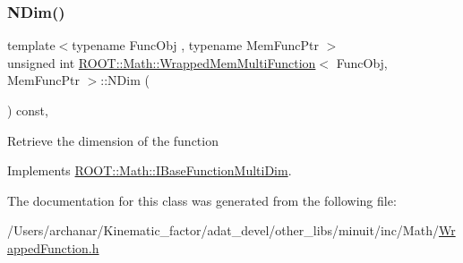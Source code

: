 \subsubsection{\texorpdfstring{NDim()}{NDim()}\hspace{0.1cm}{\footnotesize\ttfamily [2/2]}}
{\footnotesize\ttfamily template$<$typename Func\+Obj , typename Mem\+Func\+Ptr $>$ \\
unsigned int \mbox{\hyperlink{classROOT_1_1Math_1_1WrappedMemMultiFunction}{R\+O\+O\+T\+::\+Math\+::\+Wrapped\+Mem\+Multi\+Function}}$<$ Func\+Obj, Mem\+Func\+Ptr $>$\+::N\+Dim (\begin{DoxyParamCaption}{ }\end{DoxyParamCaption}) const\hspace{0.3cm}{\ttfamily [inline]}, {\ttfamily [virtual]}}

Retrieve the dimension of the function 

Implements \mbox{\hyperlink{classROOT_1_1Math_1_1IBaseFunctionMultiDim_a16f37dc7a6d00c75ddeda0697741315d}{R\+O\+O\+T\+::\+Math\+::\+I\+Base\+Function\+Multi\+Dim}}.



The documentation for this class was generated from the following file\+:\begin{DoxyCompactItemize}
\item 
/\+Users/archanar/\+Kinematic\+\_\+factor/adat\+\_\+devel/other\+\_\+libs/minuit/inc/\+Math/\mbox{\hyperlink{other__libs_2minuit_2inc_2Math_2WrappedFunction_8h}{Wrapped\+Function.\+h}}\end{DoxyCompactItemize}
